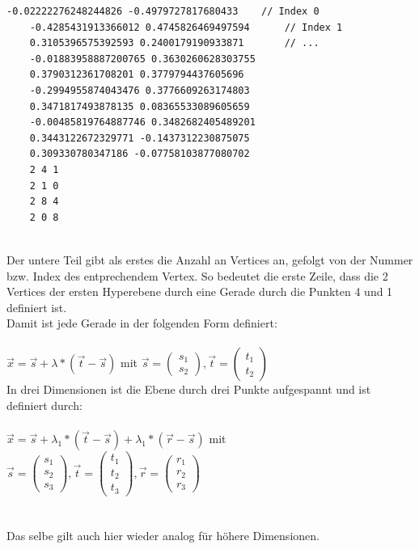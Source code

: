 \documentclass[12pt]{scrartcl}
\begin{document}
\begin{lstlisting}[style=Terminal, caption={Ausgabe von qconvex mit Option 'o'},captionpos=b]
    -0.02222276248244826 -0.4979727817680433    // Index 0
    -0.4285431913366012 0.4745826469497594      // Index 1
    0.3105396575392593 0.2400179190933871       // ...
    -0.01883958887200765 0.3630260628303755 
    0.3790312361708201 0.3779794437605696 
    -0.2994955874043476 0.3776609263174803 
    0.3471817493878135 0.08365533089605659 
    -0.00485819764887746 0.3482682405489201 
    0.3443122672329771 -0.1437312230875075 
    0.309330780347186 -0.07758103877080702 
    2 4 1 
    2 1 0 
    2 8 4 
    2 0 8 
\end{lstlisting}
\ \\
Der untere Teil gibt als erstes die Anzahl an Vertices an, gefolgt von der Nummer bzw. Index des entprechendem Vertex. So bedeutet die erste Zeile, dass die 2 Vertices der ersten Hyperebene durch eine Gerade durch die Punkten 4 und 1 definiert ist.\\
Damit ist jede Gerade in der folgenden Form definiert:\\~\\
$ \vec{x} = \vec{s} + \lambda * (\vec{t}-\vec{s})$ mit $\vec{s} = \begin{pmatrix} s_1 \\ s_2 \end{pmatrix}, \vec{t} = \begin{pmatrix} t_1 \\ t_2 \end{pmatrix}$
\ \\
In drei Dimensionen ist die Ebene durch drei Punkte aufgespannt und ist definiert durch:\\~\\
$ \vec{x} = \vec{s} + \lambda_1 * (\vec{t}-\vec{s}) + \lambda_1 * (\vec{r}-\vec{s})$ mit $\vec{s} = \begin{pmatrix} s_1 \\ s_2 \\ s_3 \end{pmatrix}, \vec{t} = \begin{pmatrix} t_1 \\ t_2 \\ t_3\end{pmatrix}, \vec{r} = \begin{pmatrix} r_1 \\ r_2 \\ r_3 \end{pmatrix}$
\ \\~\\~\\
Das selbe gilt auch hier wieder analog für höhere Dimensionen.\\
\end{document}
